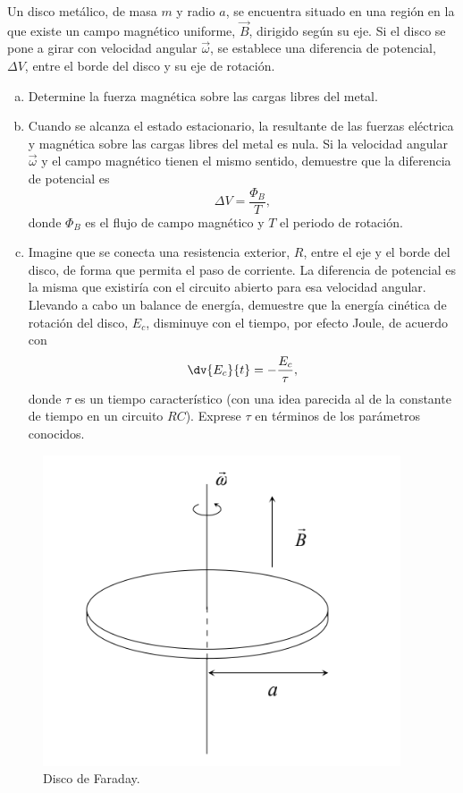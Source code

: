 \begin{mdframed}[style=warning]
	\begin{ejercicio}
		Un disco metálico, de masa $m$ y radio $a$, se encuentra situado en una región en la que existe un campo magnético uniforme, $\vec{B}$, dirigido según su eje. Si el disco se pone a girar con velocidad angular $\vec{\omega}$, se establece una diferencia de potencial, $\Delta V$, entre el borde del disco y su eje de rotación.
		\begin{enumerate}[a)]
			\item Determine la fuerza magnética sobre las cargas libres del metal.
			\item Cuando se alcanza el estado estacionario, la resultante de las fuerzas eléctrica y magnética sobre las cargas libres del metal es nula. Si la velocidad angular $\vec{\omega}$ y el campo magnético tienen el mismo sentido, demuestre que la diferencia de potencial es
				$$ \Delta V = \frac{\Phi _B}{T}, $$
			donde $\Phi _B$ es el flujo de campo magnético y $T$ el periodo de rotación.
			\item Imagine que se conecta una resistencia exterior, $R$,  entre el eje y el borde del disco, de forma que permita el paso de corriente. La diferencia de potencial es la misma que existiría con el circuito abierto para esa velocidad angular. Llevando a cabo un balance de energía, demuestre que la energía cinética de rotación del disco, $E_c$, disminuye con el tiempo, por efecto Joule, de acuerdo con
				$$ \dv{E_c}{t} = -\frac{E_c}{\tau}, $$
			donde $\tau$ es un tiempo característico (con una idea parecida al de la constante de tiempo en un circuito $RC$). Exprese $\tau$ en términos de los parámetros conocidos.
		\end{enumerate}
		\begin{figure}[H]
			\centering
			\includegraphics[scale=0.5]{./img/discoFaraday.png}
			\caption{Disco de Faraday.}
			\label{DF}	
		\end{figure}
	\end{ejercicio}
\end{mdframed}
